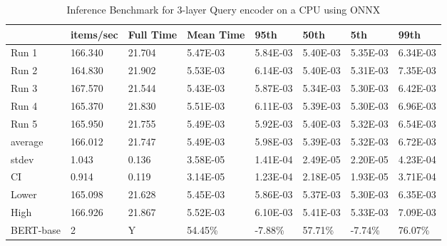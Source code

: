 \begin{table*}[!ht]
    \centering
    \begin{tabular}{|l|l|l|l|l|l|l|l|}
    \hline
        ~ & items/sec & Full Time & Mean Time & 95th & 50th & 5th & 99th \\ \hline
        Run 1 & 166.340 & 21.704 & 5.47E-03 & 5.84E-03 & 5.40E-03 & 5.35E-03 & 6.34E-03 \\ \hline
        Run 2 & 164.830 & 21.902 & 5.53E-03 & 6.14E-03 & 5.40E-03 & 5.31E-03 & 7.35E-03 \\ \hline
        Run 3 & 167.570 & 21.544 & 5.43E-03 & 5.87E-03 & 5.34E-03 & 5.30E-03 & 6.42E-03 \\ \hline
        Run 4 & 165.370 & 21.830 & 5.51E-03 & 6.11E-03 & 5.39E-03 & 5.30E-03 & 6.96E-03 \\ \hline
        Run 5 & 165.950 & 21.755 & 5.49E-03 & 5.92E-03 & 5.40E-03 & 5.32E-03 & 6.54E-03 \\ \hline
        average & 166.012 & 21.747 & 5.49E-03 & 5.98E-03 & 5.39E-03 & 5.32E-03 & 6.72E-03 \\ \hline
        stdev & 1.043 & 0.136 & 3.58E-05 & 1.41E-04 & 2.49E-05 & 2.20E-05 & 4.23E-04 \\ \hline
        CI & 0.914 & 0.119 & 3.14E-05 & 1.23E-04 & 2.18E-05 & 1.93E-05 & 3.71E-04 \\ \hline
        Lower & 165.098 & 21.628 & 5.45E-03 & 5.86E-03 & 5.37E-03 & 5.30E-03 & 6.35E-03 \\ \hline
        High & 166.926 & 21.867 & 5.52E-03 & 6.10E-03 & 5.41E-03 & 5.33E-03 & 7.09E-03 \\ \hline
        BERT-base & 2 & Y & 54.45\% & -7.88\% & 57.71\% & -7.74\% & 76.07\% \\ \hline
    \end{tabular}
    \caption{Inference Benchmark for 3-layer Query encoder on a CPU using ONNX}
    \label{tab:benchmark-cpu-3layer}
\end{table*}

